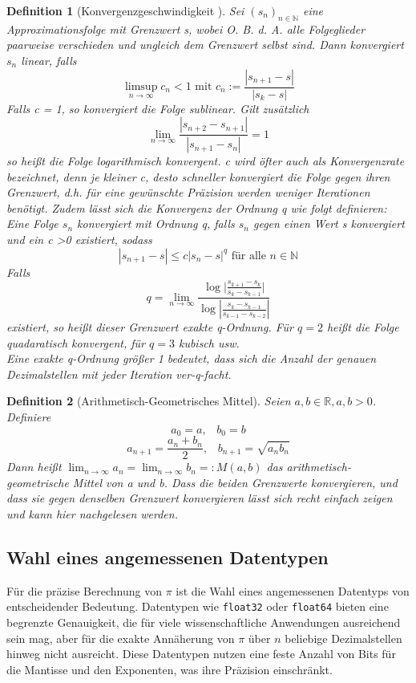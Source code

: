 \documentclass{scrartcl}
\newtheorem{definition}{Definition}
\theoremstyle{definition}
\newtheorem{approximation sequence}{Annäherungsfolge}
\begin{document}
\begin{definition}[Konvergenzgeschwindigkeit \cite{Konvergenzgeschwindigkeit}]
    Sei \((s_n)_{n \in \mathbb{N}}\) eine Approximationsfolge mit Grenzwert s, wobei O. B. d. A. alle Folgeglieder paarweise verschieden und ungleich dem Grenzwert selbst sind.
    Dann konvergiert \(s_n\) linear, falls
    \[\limsup_{n \to \infty} c_n < 1 \text{ mit } c_n := \frac{|s_{n+1}-s|}{|s_k-s|} \]
    Falls c = 1, so konvergiert die Folge sublinear.
    Gilt zusätzlich 
    \[\lim_{n \to \infty} \frac{|s_{n+2}-s_{n+1}|}{|s_{n+1}-s_n|} = 1\]
    so heißt die Folge logarithmisch konvergent.
    c wird öfter auch als Konvergenzrate bezeichnet, denn je kleiner c, desto schneller konvergiert die Folge gegen ihren Grenzwert, 
    d.h. für eine gewünschte Präzision werden weniger Iterationen benötigt.
    Zudem lässt sich die Konvergenz der Ordnung q wie folgt definieren:
    Eine Folge \(s_n\) konvergiert mit Ordnung q, falls \(s_n\) gegen einen Wert s konvergiert und ein c \textgreater 0 existiert, sodass
    \[|s_{n+1} - s| \leqslant c|s_n - s|^q \text{ für alle } n \in \mathbb{N}\]
    Falls
    \[q = \lim_{n \to \infty} \frac{\log|{\frac{s_{k+1} - s_k}{s_k - s_{k-1}}|}}{\log{|\frac{s_k - s_{k-1}}{s_{k-1} - s_{k-2}}|}} \]
    existiert, so heißt dieser Grenzwert exakte q-Ordnung.
    Für \(q = 2\) heißt die Folge quadaratisch konvergent, für \(q = 3 \) kubisch usw. \\
    Eine exakte q-Ordnung größer 1 bedeutet, dass sich die Anzahl der genauen Dezimalstellen mit jeder Iteration ver-q-facht.
\end{definition}

\begin{definition}[Arithmetisch-Geometrisches Mittel]
    Seien \(a, b \in \mathbb{R}, a,b > 0\). Definiere 
    \[a_0 = a, \;\;\; b_0 = b\]
    \[a_{n+1} = \frac{a_n + b_n}{2}, \;\;\; b_{n+1} = \sqrt{a_n b_n}\]
    Dann heißt \(\lim_{n \to \infty}a_n = \lim_{n \to \infty} b_n =: M(a,b) \) das arithmetisch-geometrische Mittel von a und b.
    Dass die beiden Grenzwerte konvergieren, und dass sie gegen denselben Grenzwert konvergieren lässt sich recht einfach zeigen und kann 
    hier \cite{AGM} nachgelesen werden.
\end{definition}


\subsection{Wahl eines angemessenen Datentypen}

Für die präzise Berechnung von \(\pi\) ist die Wahl eines angemessenen
Datentyps von entscheidender Bedeutung. Datentypen wie \texttt{float32} oder
\texttt{float64} bieten eine begrenzte Genauigkeit, die für viele
wissenschaftliche Anwendungen ausreichend sein mag, aber für die exakte
Annäherung von \(\pi\) über \(n\) beliebige Dezimalstellen hinweg nicht
ausreicht.
Diese Datentypen nutzen eine feste Anzahl von Bits für die Mantisse und den
Exponenten, was ihre Präzision einschränkt.
\end{document}
